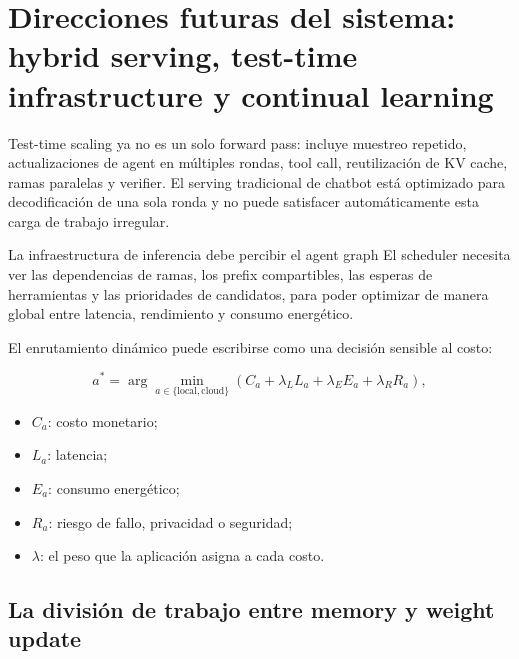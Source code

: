 \section{Direcciones futuras del sistema: hybrid serving, test-time infrastructure y continual learning}


Test-time scaling ya no es un solo forward pass: incluye muestreo repetido, actualizaciones de agent en múltiples rondas, tool call, reutilización de KV cache, ramas paralelas y verifier. El serving tradicional de chatbot está optimizado para decodificación de una sola ronda y no puede satisfacer automáticamente esta carga de trabajo irregular.

\begin{importantbox}{La infraestructura de inferencia debe percibir el agent graph}
El scheduler necesita ver las dependencias de ramas, los prefix compartibles, las esperas de herramientas y las prioridades de candidatos, para poder optimizar de manera global entre latencia, rendimiento y consumo energético.
\end{importantbox}


El enrutamiento dinámico puede escribirse como una decisión sensible al costo:

$$
a^*=\arg\min_{a\in\{\text{local},\text{cloud}\}}
\left(C_a+\lambda_L L_a+\lambda_E E_a+\lambda_R R_a\right),
$$

\begin{itemize}
    \item $C_a$: costo monetario;
    \item $L_a$: latencia;
    \item $E_a$: consumo energético;
    \item $R_a$: riesgo de fallo, privacidad o seguridad;
    \item $\lambda$: el peso que la aplicación asigna a cada costo.
\end{itemize}

\subsection{La división de trabajo entre memory y weight update}


